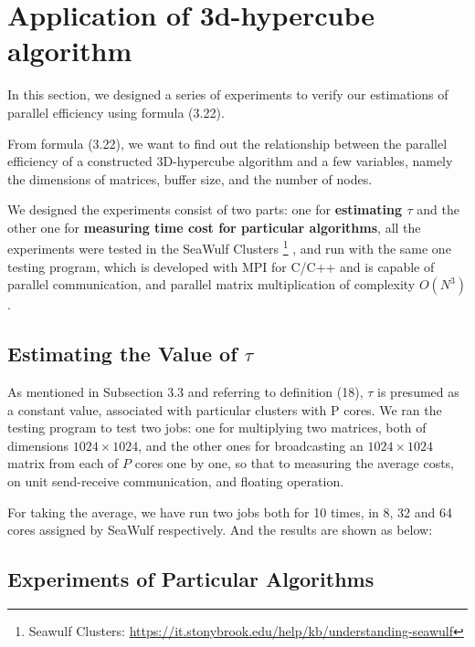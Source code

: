 \documentclass{amsart}
\theoremstyle{definition}
\theoremstyle{remark}
\numberwithin{equation}{section}
\begin{document}
\section{Application of 3d-hypercube algorithm}
	In this section, we designed a series of experiments to verify our estimations of parallel efficiency using formula (3.22).\par
	From formula (3.22), we want to find out the relationship between the parallel efficiency of a constructed 3D-hypercube algorithm and a few variables, namely the dimensions of matrices, buffer size, and the number of nodes.\par
	We designed the experiments consist of two parts: one for \textbf{estimating $\tau$} and the other one for \textbf{measuring time cost for particular algorithms}, all the experiments were tested in the SeaWulf Clusters%
\footnote{Seawulf Clusters: \url{https://it.stonybrook.edu/help/kb/understanding-seawulf}}%
, and run with the same one testing program, which is developed with MPI for C/C++ and is capable of parallel communication, and parallel matrix multiplication of complexity $O(N^3)$.\par

\subsection{Estimating the Value of \textbf{$\tau$}}
	As mentioned in Subsection 3.3 and referring to definition (18), $\tau$ is presumed as a constant value, associated with particular clusters with P cores. We ran the testing program to test two jobs: one for multiplying two matrices, both of dimensions $1024\times 1024$, and the other ones for broadcasting an $1024\times 1024$ matrix from each of $P$ cores one by one, so that to measuring the average costs, on unit send-receive communication, and floating operation.\par
	For taking the average, we have run two jobs both for 10 times, in 8, 32 and 64 cores assigned by SeaWulf
respectively. And the results are shown as below:\par

		
\subsection{Experiments of Particular Algorithms}
\end{document}
